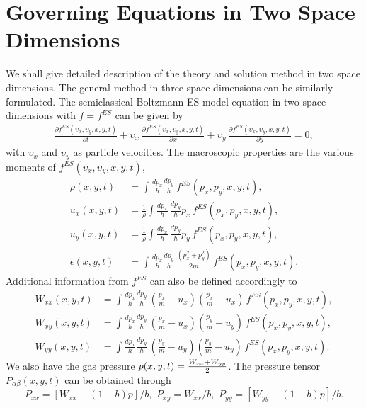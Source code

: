 \documentclass{rsproca}%
\begin{document}
\section{Governing Equations in Two Space Dimensions}
\label{sec:3 1}
We shall give detailed description of the theory and solution method in two space dimensions.   The general method in three space dimensions can be similarly
formulated.   The semiclassical Boltzmann-ES model equation in two space dimensions with $f=f^{ES}$ can be given by
\begin{align}
\frac{\partial f^{ES}({\upsilon}_x,{\upsilon}_y, x, y, t)}{\partial t} + {\upsilon}_x\,\frac{\partial f^{ES}({\upsilon}_x,{\upsilon}_y, x, y, t)}{\partial x } + {\upsilon}_y\,\frac{\partial f^{ES}({\upsilon}_x,{\upsilon}_y, x, y, t)} {\partial y} =0, \label{normalizedes}
\end{align}
with ${\upsilon}_x$ and ${\upsilon}_y$ as particle velocities.   The macroscopic properties are the various moments of $f^{ES}({\upsilon}_x,{\upsilon}_y,x,y,t)$,
\begin {align}
\rho (x,y,t) 			&= \int \frac{ d p_x}{h} \frac{ d p_y}{h} \, f^{ES}(p_x, p_y, x, y, t), \\
u_x (x,y,t) 			&= \frac{1}{\rho} \int 	 \frac{ d p_x}{h} \, \frac{ d p_y}{h}  p_x \, f^{ES}(p_x, p_y, x, y, t), \\
u_y (x,y,t) 			&= \frac{1}{\rho} \int 	 \frac{ d p_x}{h} \, \frac{ d p_y}{h}  p_y \, f^{ES}(p_x, p_y, x, y, t), \\
\epsilon (x,y,t) 	&= \int \frac{ d p_x}{h} \frac{ d p_y}{h} \, \frac{(p_x^2 + p_y^2)}{2m} \, f^{ES}(p_x, p_y, x, y, t).
\end{align}
Additional information from $f^{ES}$ can also be defined accordingly to
\begin{align}
W_{x x}(x,y,t)	&=	\int \frac{ d p_x}{h} \frac{ d p_y}{h} \, (\frac{p_x}{m}-u_x)(\frac{p_x}{m}-u_x)\,f^{ES}(p_x, p_y, x, y, t), \\
W_{x y}(x,y,t)	&=	\int \frac{ d p_x}{h} \frac{ d p_y}{h} \, (\frac{p_x}{m}-u_x)(\frac{p_y}{m}-u_y)\,f^{ES}(p_x, p_y, x, y, t), \\
W_{y y}(x,y,t)	&=	\int \frac{ d p_x}{h} \frac{ d p_y}{h} \, (\frac{p_y}{m}-u_y)(\frac{p_y}{m}-u_y)\,f^{ES}(p_x, p_y, x, y, t). 
\end{align}
We also have the gas pressure $p(x,y,t) = {W_{xx} + W_{yy} \over 2}$.  The pressure tensor $P_{\alpha \beta}(x,y,t)$ can be obtained through
\begin{equation}
P_{xx} = [W_{xx} - (1-b)p]/b, \,\, P_{xy} = W_{xx}/b, \,\, P_{yy} = [W_{yy} - (1-b)p]/b.
\end{equation}
\end{document}
